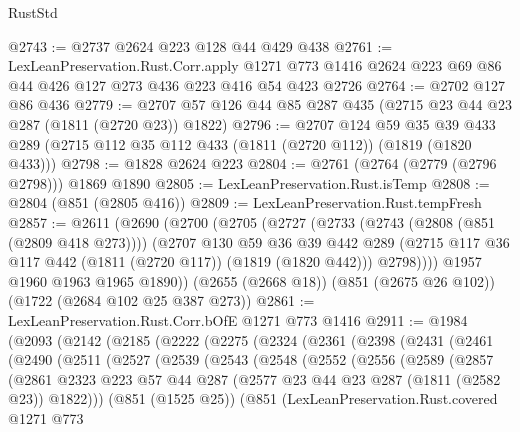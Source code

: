 \begin{lexlean}{RustStd}
\begin{coremodule}
@2743 := @2737 @2624 @223 @128 @44 @429 @438
@2761 := LexLeanPreservation.Rust.Corr.apply
    @1271
    @773
    @1416
    @2624
    @223
    @69
    @86
    @44
    @426
    @127
    @273
    @436
    @223
    @416
    @54
    @423
    @2726
@2764 := @2702 @127 @86 @436
@2779 := @2707 @57 @126 @44 @85 @287 @435 (@2715 @23 @44 @23 @287 (@1811 (@2720 @23)) @1822)
@2796 := @2707
    @124
    @59
    @35
    @39
    @433
    @289
    (@2715 @112 @35 @112 @433 (@1811 (@2720 @112)) (@1819 (@1820 @433)))
@2798 := @1828 @2624 @223
@2804 := @2761 (@2764 (@2779 (@2796 @2798))) @1869 @1890
@2805 := LexLeanPreservation.Rust.isTemp
@2808 := @2804 (@851 (@2805 @416))
@2809 := LexLeanPreservation.Rust.tempFresh
@2857 := @2611
    (@2690
      (@2700
        (@2705
          (@2727
            (@2733
              (@2743 (@2808 (@851 (@2809 @418 @273))))
              (@2707
                @130
                @59
                @36
                @39
                @442
                @289
                (@2715 @117 @36 @117 @442 (@1811 (@2720 @117)) (@1819 (@1820 @442)))
                @2798))))
        @1957
        @1960
        @1963
        @1965
        @1890))
    (@2655 (@2668 @18))
    (@851 (@2675 @26 @102))
    (@1722 (@2684 @102 @25 @387 @273))
@2861 := LexLeanPreservation.Rust.Corr.bOfE @1271 @773 @1416
@2911 := @1984
    (@2093
      (@2142
        (@2185
          (@2222
            (@2275
              (@2324
                (@2361
                  (@2398
                    (@2431
                      (@2461
                        (@2490
                          (@2511
                            (@2527
                              (@2539
                                (@2543
                                  (@2548
                                    (@2552
                                      (@2556
                                        (@2589
                                          (@2857
                                            (@2861
                                              @2323
                                              @223
                                              @57
                                              @44
                                              @287
                                              (@2577 @23 @44 @23 @287 (@1811 (@2582 @23)) @1822)))
                                          (@851 (@1525 @25))
                                          (@851
                                            (LexLeanPreservation.Rust.covered
                                              @1271
                                              @773

\end{coremodule}
\end{lexlean}
